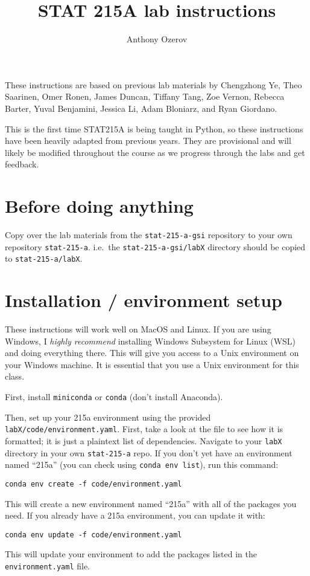 \documentclass[letterpaper,12pt]{article}
\title{STAT 215A lab instructions}
\author{Anthony Ozerov}
\begin{document}
\maketitle

These instructions are based on previous lab materials by Chengzhong Ye, Theo Saarinen, Omer Ronen, James Duncan, Tiffany Tang, Zoe Vernon, Rebecca Barter, Yuval Benjamini, Jessica Li, Adam Bloniarz, and Ryan Giordano.

This is the first time STAT215A is being taught in Python, so these instructions have been heavily adapted from previous years. They are provisional and will likely be modified throughout the course as we progress through the labs and get feedback.

\section{Before doing anything}
Copy over the lab materials from the \texttt{stat-215-a-gsi} repository to your own repository \texttt{stat-215-a}. i.e.~the \texttt{stat-215-a-gsi/labX} directory should be copied to \texttt{stat-215-a/labX}.

\section{Installation / environment setup}

These instructions will work well on MacOS and Linux. If you are using Windows, I \textit{highly recommend} installing Windows Subsystem for Linux (WSL) and doing everything there. This will give you access to a Unix environment on your Windows machine. It is essential that you use a Unix environment for this class.

First, install \texttt{miniconda} or \texttt{conda} (don't install Anaconda).

Then, set up your 215a environment using the provided \texttt{labX/code/environment.yaml}. First, take a look at the file to see how it is formatted; it is just a plaintext list of dependencies. Navigate to your \texttt{labX} directory in your own \texttt{stat-215-a} repo. If you don't yet have an environment named ``215a'' (you can check using \texttt{conda env list}), run this command:
\begin{verbatim}
conda env create -f code/environment.yaml
\end{verbatim}
This will create a new environment named ``215a'' with all of the packages you need. If you already have a 215a environment, you can update it with:
\begin{verbatim}
conda env update -f code/environment.yaml
\end{verbatim}
This will update your environment to add the packages listed in the \texttt{environment.yaml} file.
\end{document}
